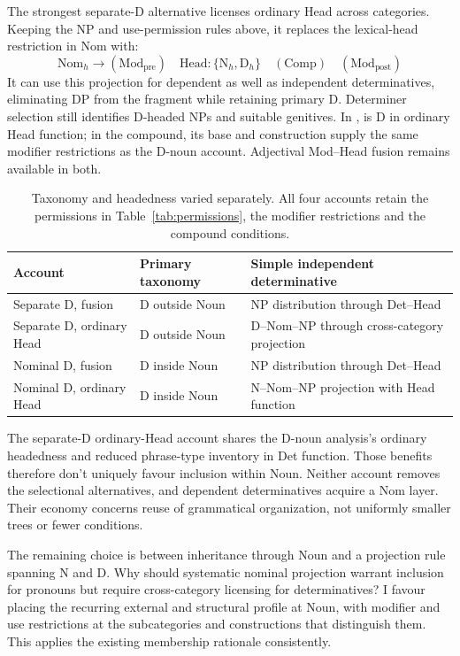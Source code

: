 \documentclass[12pt]{article}
\begin{document}
The strongest separate-D alternative licenses ordinary Head across categories. Keeping the NP and use-permission rules above, it replaces the lexical-head restriction in Nom with:
\[
\mathrm{Nom}_{h}\to(\mathrm{Mod}_{\mathrm{pre}})\quad\mathrm{Head}:\{\mathrm{N}_{h},\mathrm{D}_{h}\}\quad(\mathrm{Comp})\quad(\mathrm{Mod}_{\mathrm{post}})
\]
It can use this projection for dependent as well as independent determinatives, eliminating DP from the fragment while retaining primary D. Determiner selection still identifies D-headed NPs and suitable genitives. In ,  is D in ordinary Head function; in the compound, its base and construction supply the same modifier restrictions as the D-noun account. Adjectival Mod--Head fusion remains available in both.

\begin{table}[tb]
\centering\small
\caption{Taxonomy and headedness varied separately. All four accounts retain the permissions in Table~\ref{tab:permissions}, the modifier restrictions and the compound conditions.}\label{tab:economy}
\begin{tabular}{>{\raggedright\arraybackslash}p{3.1cm}>{\raggedright\arraybackslash}p{3.9cm}>{\raggedright\arraybackslash}p{4.7cm}}
\toprule
Account & Primary taxonomy & Simple independent determinative \\
\midrule
Separate D, fusion & D outside Noun & NP distribution through Det--Head \\
Separate D, ordinary Head & D outside Noun & D--Nom--NP through cross-category projection \\
Nominal D, fusion & D inside Noun & NP distribution through Det--Head \\
Nominal D, ordinary Head & D inside Noun & N--Nom--NP projection with Head function \\
\bottomrule
\end{tabular}
\end{table}

The separate-D ordinary-Head account shares the D-noun analysis's ordinary headedness and reduced phrase-type inventory in Det function. Those benefits therefore don't uniquely favour inclusion within Noun. Neither account removes the selectional alternatives, and dependent determinatives acquire a Nom layer. Their economy concerns reuse of grammatical organization, not uniformly smaller trees or fewer conditions.

The remaining choice is between inheritance through Noun and a projection rule spanning N and D. Why should systematic nominal projection warrant inclusion for pronouns but require cross-category licensing for determinatives? I favour placing the recurring external and structural profile at Noun, with modifier and use restrictions at the subcategories and constructions that distinguish them. This applies the existing membership rationale consistently.
\end{document}
